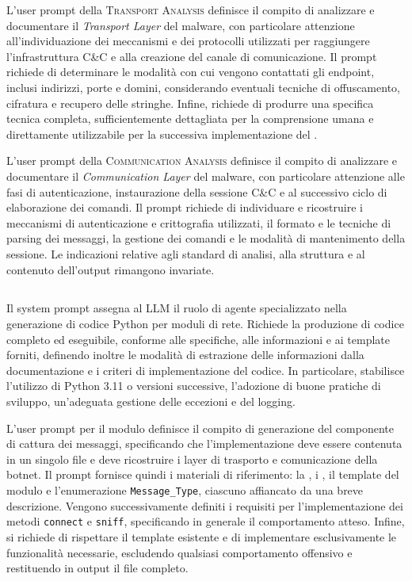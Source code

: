 L'user prompt della \textsc{Transport Analysis} definisce il compito di analizzare e documentare il \emph{Transport Layer} del malware, con particolare attenzione all'individuazione dei meccanismi e dei protocolli utilizzati per raggiungere l'infrastruttura C\&C e alla creazione del canale di comunicazione. Il prompt richiede di determinare le modalità con cui vengono contattati gli endpoint, inclusi indirizzi, porte e domini, considerando eventuali tecniche di offuscamento, cifratura e recupero delle stringhe. Infine, richiede di produrre una specifica tecnica completa, sufficientemente dettagliata per la comprensione umana e direttamente utilizzabile per la successiva implementazione del \capture{}.

L'user prompt della \textsc{Communication Analysis} definisce il compito di analizzare e documentare il \emph{Communication Layer} del malware, con particolare attenzione alle fasi di autenticazione, instaurazione della sessione C\&C e al successivo ciclo di elaborazione dei comandi. Il prompt richiede di individuare e ricostruire i meccanismi di autenticazione e crittografia utilizzati, il formato e le tecniche di parsing dei messaggi, la gestione dei comandi e le modalità di mantenimento della sessione. Le indicazioni relative agli standard di analisi, alla struttura e al contenuto dell'output rimangono invariate.

\subsection{\codeagent{}} %

Il system prompt assegna al LLM il ruolo di agente specializzato nella generazione di codice Python per moduli di rete. Richiede la produzione di codice completo ed eseguibile, conforme alle specifiche, alle informazioni e ai template forniti, definendo inoltre le modalità di estrazione delle informazioni dalla documentazione e i criteri di implementazione del codice. In particolare, stabilisce l'utilizzo di Python 3.11 o versioni successive, l'adozione di buone pratiche di sviluppo, un'adeguata gestione delle eccezioni e del logging.

L'user prompt per il modulo \botnet{} definisce il compito di generazione del componente di cattura dei messaggi, specificando che l'implementazione deve essere contenuta in un singolo file e deve ricostruire i layer di trasporto e comunicazione della botnet. Il prompt fornisce quindi i materiali di riferimento: la \interface{}, i \report{}, il template del modulo e l'enumerazione \texttt{Message\_Type}, ciascuno affiancato da una breve descrizione. Vengono successivamente definiti i requisiti per l'implementazione dei metodi \texttt{connect} e \texttt{sniff}, specificando in generale il comportamento atteso. Infine, si richiede di rispettare il template esistente e di implementare esclusivamente le funzionalità necessarie, escludendo qualsiasi comportamento offensivo e restituendo in output il file completo.

